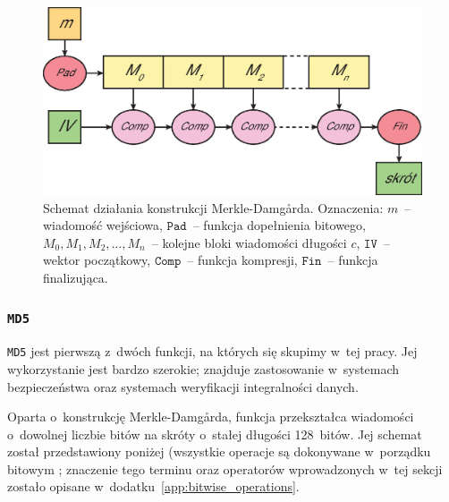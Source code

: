 \begin{figure}[H]
    \includegraphics[width=12cm]{img/merkle_damgard.eps}
    \caption{Schemat działania konstrukcji Merkle-Damg\r{a}rda. Oznaczenia:
    $m$~-- wiadomość wejściowa, $\mathtt{Pad}$~-- funkcja dopełnienia bitowego,
    $M_0, M_1, M_2, \ldots, M_n$~-- kolejne bloki wiadomości długości $c$,
    $\mathtt{IV}$~-- wektor początkowy, $\mathtt{Comp}$~-- funkcja kompresji,
    $\mathtt{Fin}$~-- funkcja finalizująca.}
    \label{fig:merkle_damgard}
\end{figure}



\subsubsection{\texttt{MD5}}
\texttt{MD5} jest pierwszą z~dwóch funkcji, na których się skupimy w~tej pracy.
Jej wykorzystanie jest bardzo szerokie; znajduje zastosowanie w~systemach
bezpieczeństwa oraz systemach weryfikacji integralności danych.

Oparta o~konstrukcję Merkle-Damg\r{a}rda, funkcja przekształca wiadomości
o~dowolnej liczbie bitów na skróty o~stałej długości 128~bitów. Jej
schemat~\cite{md5_definition} został przedstawiony poniżej (wszystkie operacje
są dokonywane w~porządku bitowym ; znaczenie tego terminu
oraz operatorów wprowadzonych w~tej sekcji zostało opisane
w~dodatku~\ref{app:bitwise_operations}.

